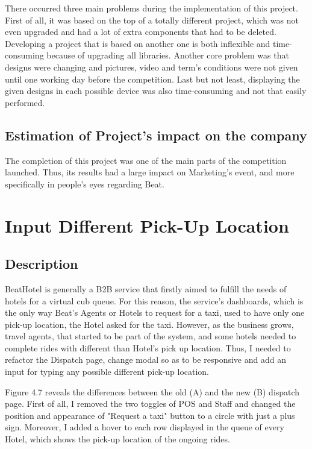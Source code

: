 There occurred three main problems during the implementation of this project. First of all, it was based on the top of a totally different project, which was not even upgraded and had a lot of extra components that had to be deleted. Developing a project that is based on another one is both inflexible and time-consuming because of upgrading all libraries. Another core problem was that designs were changing and pictures, video and term's conditions were not given until one working day before the competition. Last but not least, displaying the given designs in each possible device was also time-consuming and not that easily performed. \par

\subsection{Estimation of Project's impact on the company}

The completion of this project was one of the main parts of the competition launched. Thus, its results had a large impact on Marketing's event, and more specifically in people's eyes regarding Beat. \par

\section{Input Different Pick-Up Location}

\subsection{Description}

BeatHotel is generally a B2B service that firstly aimed to fulfill the needs of hotels for a virtual cub queue. For this reason, the service's dashboards, which is the only way Beat's Agents or Hotels to request for a taxi, used to have only one pick-up location, the Hotel asked for the taxi. However, as the business grows, travel agents, that started to be part of the system, and some hotels needed to complete rides with different than Hotel's pick up location. Thus, I needed to refactor the Dispatch page, change modal so as to be responsive and add an input for typing any possible different pick-up location. \par

Figure 4.7 reveals the differences between the old (A) and the new (B) dispatch page. First of all, I removed the two toggles of POS and Staff and changed the position and appearance of "Request a taxi" button to a circle with just a plus sign. Moreover, I added a hover to each row displayed in the queue of every Hotel, which shows the pick-up location of the ongoing rides. \par

